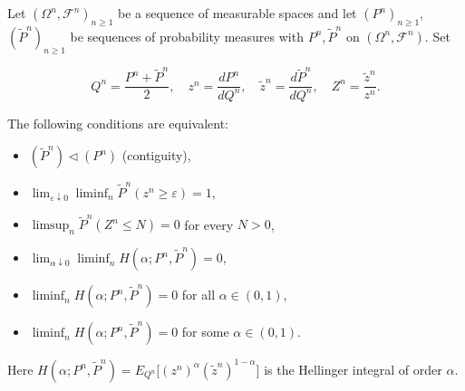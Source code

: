 Let $(\Omega^n, \mathcal{F}^n)_{n \geq 1}$ be a sequence of measurable spaces and let $(P^n)_{n \geq 1}$, $(\tilde{P}^n)_{n \geq 1}$ be sequences of probability measures with $P^n, \tilde{P}^n$ on $(\Omega^n, \mathcal{F}^n)$. Set

$$Q^n = \frac{P^n + \tilde{P}^n}{2}, \quad z^n = \frac{dP^n}{dQ^n}, \quad \tilde{z}^n = \frac{d\tilde{P}^n}{dQ^n}, \quad Z^n = \frac{\tilde{z}^n}{z^n}.$$

The following conditions are equivalent:

\begin{itemize}
\item[(a)] $(\tilde{P}^n) \triangleleft (P^n)$ (contiguity),
\item[(b)] $\displaystyle \lim_{\varepsilon \downarrow 0} \liminf_n \tilde{P}^n(z^n \geq \varepsilon) = 1$,
\item[(b$'$)] $\displaystyle \limsup_n \tilde{P}^n(Z^n \leq N) = 0$ for every $N > 0$,
\item[(c)] $\displaystyle \lim_{\alpha \downarrow 0} \liminf_n H(\alpha; P^n, \tilde{P}^n) = 0$,
\item[(d)] $\displaystyle \liminf_n H(\alpha; P^n, \tilde{P}^n) = 0$ for all $\alpha \in (0, 1)$,
\item[(e)] $\displaystyle \liminf_n H(\alpha; P^n, \tilde{P}^n) = 0$ for some $\alpha \in (0, 1)$.
\end{itemize}

Here $H(\alpha; P^n, \tilde{P}^n) = E_{Q^n}\big[(z^n)^\alpha (\tilde{z}^n)^{1-\alpha}\big]$ is the Hellinger integral of order $\alpha$.
